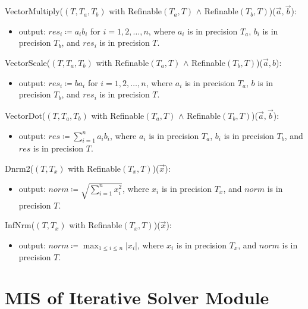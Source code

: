 \documentclass[12pt, titlepage]{article}
\begin{document}
\noindent VectorMultiply(\((T, T_a, T_b)\) with Refinable\((T_a, T)\) \(\land\)
Refinable\((T_b, T)\))(\(\vec{a}, \vec{b}\)):
\begin{itemize}
\item output: \(\displaystyle res_i \coloneq a_i b_i\) for \(i = 1, 2, \dots, n\), where
  \(a_i\) is in precision \(T_a\), \(b_i\) is in precision \(T_b\), and
  \(res_i\) is in precision \(T\).
\end{itemize}

\noindent VectorScale(\((T, T_a, T_b)\) with Refinable\((T_a, T)\) \(\land\)
Refinable\((T_b, T)\))(\(\vec{a}, b\)):
\begin{itemize}
\item output: \(\displaystyle res_i \coloneq b a_i\) for \(i = 1, 2, \dots, n\), where
  \(a_i\) is in precision \(T_a\), \(b\) is in precision \(T_b\), and \(res_i\)
  is in precision \(T\).
\end{itemize}

\noindent VectorDot(\((T, T_a, T_b)\) with Refinable\((T_a, T)\) \(\land\)
Refinable\((T_b, T)\))(\(\vec{a}, \vec{b}\)):
\begin{itemize}
\item output: \(\displaystyle res \coloneq \sum_{i=1}^n a_ib_i\), where \(a_i\) is in
  precision \(T_a\), \(b_i\) is in precision \(T_b\), and \(res\) is in
  precision \(T\).
\end{itemize}

\noindent Dnrm2(\((T, T_x)\) with Refinable\((T_x, T)\))(\(\vec{x}\)):
\begin{itemize}
\item output: \(\displaystyle norm \coloneq \sqrt{\sum_{i=1}^n x_i^2}\), where \(x_i\) is in
  precision \(T_x\), and \(norm\) is in precision \(T\).
\end{itemize}

\noindent InfNrm(\((T, T_x)\) with Refinable\((T_x, T)\))(\(\vec{x}\)):
\begin{itemize}
\item output: \(\displaystyle norm \coloneq \max_{1 \leq i \leq n}|x_i|\), where \(x_i\) is
  in precision \(T_x\), and \(norm\) is in precision \(T\).
\end{itemize}

\newpage

\section{MIS of Iterative Solver Module} \label{M:solve}
\end{document}
